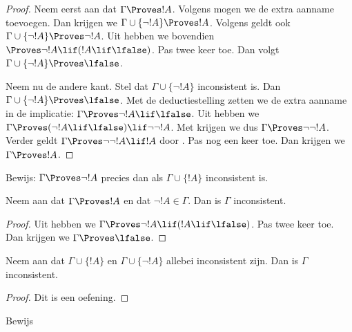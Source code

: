 \documentclass[openany]{memoir}
\begin{document}
\begin{proof}
Neem eerst aan dat $\Gamma \Proves !A$. Volgens
 mogen we de extra aanname toevoegen. Dan
krijgen we $\Gamma \cup \{\lnot !A\} \Proves !A$. Volgens
 geldt ook $\Gamma \cup \{\lnot !A\}
\Proves \lnot !A$. Uit  hebben we bovendien
$\Proves \lnot !A \lif (!A \lif \lfalse)$. Pas
 twee keer toe. Dan volgt $\Gamma \cup \{\lnot
!A\} \Proves \lfalse$.

Neem nu de andere kant. Stel dat $\Gamma \cup \{\lnot !A\}$
inconsistent is. Dan $\Gamma \cup \{\lnot !A\} \Proves \lfalse$.
Met de deductiestelling zetten we de extra aanname in de implicatie:
$\Gamma \Proves \lnot !A \lif \lfalse$. Uit
 hebben we $\Gamma \Proves (\lnot !A \lif
\lfalse) \lif \lnot\lnot !A$. Met  krijgen we dus
$\Gamma \Proves \lnot\lnot !A$. Verder geldt $\Gamma \Proves
\lnot\lnot !A \lif !A$ door . Pas
 nog een keer toe. Dan krijgen we $\Gamma \Proves
!A$.
\end{proof}

\begin{prob}
Bewijs: $\Gamma \Proves \lnot !A$ precies dan als $\Gamma \cup
\{!A\}$ inconsistent is.
\end{prob}

\begin{prop}
  Neem aan dat $\Gamma \Proves !A$ en dat $\lnot !A \in \Gamma$.
  Dan is $\Gamma$ inconsistent.
\end{prop}

\begin{proof}
  Uit  hebben we $\Gamma \Proves \lnot !A \lif
  (!A \lif \lfalse)$. Pas  twee keer toe. Dan
  krijgen we $\Gamma \Proves \lfalse$.
\end{proof}


\begin{prop}
  Neem aan dat $\Gamma \cup \{!A\}$ en $\Gamma \cup \{\lnot !A\}$
  allebei inconsistent zijn. Dan is $\Gamma$ inconsistent.
\end{prop}

\begin{proof}
Dit is een oefening.
\end{proof}

\begin{prob}
  Bewijs 
\end{prob}
\tagendprob
\end{document}
